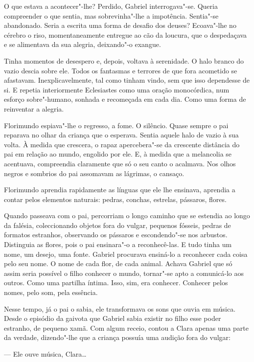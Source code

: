 O que estava a acontecer"-lhe? Perdido, Gabriel interrogava"-se. Queria
compreender o que sentia, mas sobrevinha"-lhe a impotência. Sentia"-se
abandonado. Seria a escrita uma forma de desafio dos deuses? Ecoava"-lhe
no cérebro o riso, momentaneamente entregue ao cão da loucura, que o
despedaçava e se alimentava da sua alegria, deixando"-o exangue.

Tinha momentos de desespero e, depois, voltava à serenidade. O halo
branco do vazio descia sobre ele. Todos os fantasmas e terrores de que
fora acometido se afastavam. Inexplicavelmente, tal como tinham vindo,
sem que isso dependesse de si. E repetia interiormente Eclesiastes como
uma oração monocórdica, num esforço sobre"-humano, sonhada e recomeçada
em cada dia. Como uma forma de reinventar a alegria.

Florimundo espiava"-lhe o regresso, a fome. O silêncio. Quase sempre o
pai reparava no olhar da criança que o esperava. Sentia aquele halo de
vazio à sua volta. À medida que crescera, o rapaz apercebera"-se da
crescente distância do pai em relação ao mundo, engolido por ele. E, à
medida que a melancolia se acentuava, compreendia claramente que só o
seu canto o acalmava. Nos olhos negros e sombrios do pai assomavam as
lágrimas, o cansaço.

Florimundo aprendia rapidamente as línguas que ele lhe ensinava,
aprendia a contar pelos elementos naturais: pedras, conchas, estrelas,
pássaros, flores.

Quando passeava com o pai, percorriam o longo caminho que se estendia ao
longo da falésia, coleccionando objetos fora do vulgar, pequenos
fósseis, pedras de formatos estranhos, observando os pássaros e
escondendo"-se nos arbustos. Distinguia as flores, pois o pai ensinara"-o
a reconhecê-las. E tudo tinha um nome, um desejo, uma fonte. Gabriel
procurava ensiná-lo a reconhecer cada coisa pelo seu nome. O nome de
cada flor, de cada animal. Achava Gabriel que só assim seria possível o
filho conhecer o mundo, tornar"-se apto a comunicá-lo aos outros. Como
uma partilha íntima. Isso, sim, era conhecer. Conhecer pelos nomes, pelo
som, pela essência.

Nesse tempo, já o pai o sabia, ele transformava os sons que ouvia em
música. Desde o episódio da gaivota que Gabriel sabia existir no filho
esse poder estranho, de pequeno xamã. Com algum receio, contou a Clara
apenas uma parte da verdade, dizendo"-lhe que a criança possuía uma
audição fora do vulgar:

--- Ele ouve música, Clara\ldots{}

